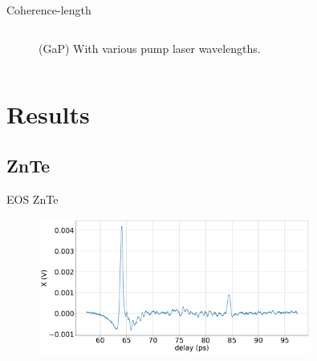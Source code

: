 \documentclass[aspectratio=1610, 9pt]{beamer}
\begin{document}
\begin{frame}{Coherence-length}
\begin{center}
\begin{columns}
\begin{column}{.4\textwidth}
\begin{figure}
      \caption{(GaP) With various pump laser wavelengths.}
    \end{figure}
    \end{column}
  \end{columns}
\end{center}
\end{frame}

\section{Results}
\subsection{ZnTe}
\begin{frame}{EOS ZnTe}
\begin{figure}
  \includegraphics[width=0.8\textwidth]{images/2_11_30_20normalX.pdf}
\end{figure}
\end{frame}
\end{document}
